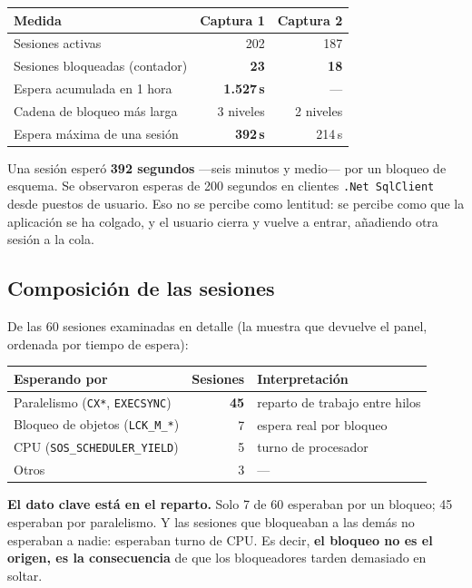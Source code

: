 \documentclass[11pt,a4paper]{article}
\newcommand{\cod}[1]{\texttt{\small #1}}
\newcommand{\critico}[1]{\textcolor{rojo}{\textbf{#1}}}
\begin{document}
\begin{table}[h]
\centering
\small
\begin{tabular}{lrr}
\toprule
\textbf{Medida} & \textbf{Captura 1} & \textbf{Captura 2} \\
\midrule
Sesiones activas              & 202 & 187 \\
Sesiones bloqueadas (contador)& \critico{23} & \critico{18} \\
Espera acumulada en 1 hora    & \critico{1.527\,s} & --- \\
Cadena de bloqueo más larga   & 3 niveles & 2 niveles \\
Espera máxima de una sesión   & \critico{392\,s} & 214\,s \\
\bottomrule
\end{tabular}
\end{table}

Una sesión esperó \textbf{392 segundos} —seis minutos y medio— por un bloqueo
de esquema. Se observaron esperas de 200 segundos en clientes
\cod{.Net SqlClient} desde puestos de usuario. Eso no se percibe como
lentitud: se percibe como que la aplicación se ha colgado, y el usuario
cierra y vuelve a entrar, añadiendo otra sesión a la cola.

\subsection{Composición de las sesiones}

De las 60 sesiones examinadas en detalle (la muestra que devuelve el panel,
ordenada por tiempo de espera):

\begin{table}[h]
\centering
\small
\begin{tabular}{lrl}
\toprule
\textbf{Esperando por} & \textbf{Sesiones} & \textbf{Interpretación} \\
\midrule
Paralelismo (\cod{CX*}, \cod{EXECSYNC}) & \critico{45} & reparto de trabajo entre hilos \\
Bloqueo de objetos (\cod{LCK\_M\_*})    & 7 & espera real por bloqueo \\
CPU (\cod{SOS\_SCHEDULER\_YIELD})       & 5 & turno de procesador \\
Otros                                   & 3 & --- \\
\bottomrule
\end{tabular}
\end{table}

\textbf{El dato clave está en el reparto.} Solo 7 de 60 esperaban por un
bloqueo; 45 esperaban por paralelismo. Y las sesiones que bloqueaban a las
demás no esperaban a nadie: esperaban turno de CPU. Es decir, \textbf{el
bloqueo no es el origen, es la consecuencia} de que los bloqueadores tarden
demasiado en soltar.
\end{document}
